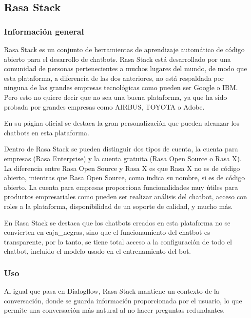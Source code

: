 \subsection{Rasa Stack}

\subsubsection*{Información general}

Rasa Stack es un conjunto de herramientas de aprendizaje automático de código abierto para el desarrollo de chatbots. Rasa Stack está desarrollado por una comunidad de personas pertenecientes a muchos lugares del mundo, de modo que esta plataforma, a diferencia de las dos anteriores, no está respaldada por ninguna de las grandes empresas tecnológicas como pueden ser Google o IBM. Pero esto no quiere decir que no sea una buena plataforma, ya que ha sido probada por grandes empresas como AIRBUS, TOYOTA o Adobe.

En su página oficial \cite{RefWorks:RefID:20-2020rasa} se destaca la gran personalización que pueden alcanzar los chatbots en esta plataforma.

Dentro de Rasa Stack se pueden distinguir dos tipos de cuenta, la cuenta para empresas (Rasa Enterprise) y la cuenta gratuita (Rasa Open Source o Rasa X). La diferencia entre Rasa Open Source y Rasa X es que Rasa X no es de código abierto, mientras que Rasa Open Source, como indica su nombre, si es de código abierto. La cuenta para empresas proporciona funcionalidades muy útiles para productos empresariales como pueden ser realizar análisis del chatbot, acceso con roles a la plataforma, disponibilidad de un soporte de calidad, y mucho más.

En Rasa Stack se destaca que los chatbots creados en esta plataforma no se convierten en \glspl{caja_negra}, sino que el funcionamiento del chatbot es transparente, por lo tanto, se tiene total acceso a la configuración de todo el chatbot, incluido el modelo usado en el entrenamiento del bot.

\subsubsection*{Uso}

Al igual que pasa en Dialogflow, Rasa Stack mantiene un contexto de la conversación, donde se guarda información proporcionada por el usuario, lo que permite una conversación más natural al no hacer preguntas redundantes.

